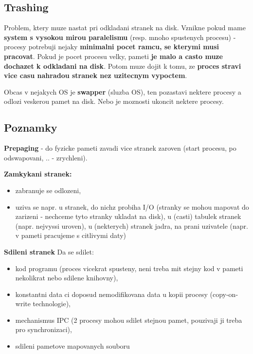 \documentclass[a4paper, 11pt]{article}
\begin{document}
\subsection{Trashing}
Problem, ktery muze nastat pri odkladani stranek na disk. Vznikne pokud mame \textbf{system s vysokou mirou paralelismu} (resp. mnoho spustenych procesu) - procesy potrebuji nejaky \textbf{minimalni pocet ramcu, se kterymi musi pracovat}. Pokud je pocet procesu velky, pameti \textbf{je malo a casto muze dochazet k odkladani na disk}. Potom muze dojit k tomu, ze \textbf{proces stravi vice casu nahradou stranek nez uzitecnym vypoctem}.

Obcas v nejakych OS je \textbf{swapper} (sluzba OS), ten pozastavi nektere procesy a odlozi veskerou pamet na disk. Nebo je moznosti ukoncit nektere procesy.

\subsection{Poznamky}
\textbf{Prepaging} - do fyzicke pameti zavadi vice stranek zaroven (start procesu, po odswapovani, .. - zrychleni).

\textbf{Zamkykani stranek:}
\begin{itemize}
    \item zabranuje se odlozeni,
    \item uziva se napr. u stranek, do nichz probiha I/O (stranky se mohou mapovat do zarizeni - nechceme tyto stranky ukladat na disk), u (casti) tabulek stranek (napr. nejvyssi uroven), u (nekterych) stranek jadra, na prani uzivatele (napr. v pameti pracujeme s citlivymi daty)
\end{itemize}

\textbf{Sdileni stranek}
Da se sdilet:
\begin{itemize}
    \item kod programu (proces vicekrat spusteny, neni treba mit stejny kod v pameti nekolikrat nebo sdilene knihovny),
    \item konstantni data ci doposud nemodifikovana data u kopii procesy (copy-on-write technologie),
    \item mechanismus IPC (2 procesy mohou sdilet stejnou pamet, pouzivaji ji treba pro synchronizaci),
    \item sdileni pametove mapovanych souboru \\
\end{itemize}
\end{document}

